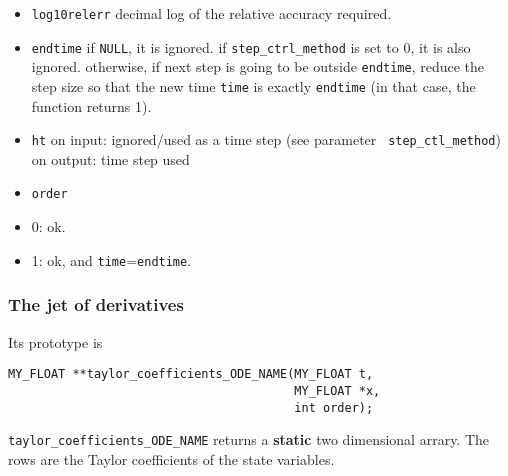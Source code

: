 \documentclass{article}
\begin{document}
{\begin{itemize}
  decimal log of the absolute accuracy required.
\item {\tt log10relerr}\newline
  decimal log of the relative accuracy required.
\item {\tt endtime}\newline
  if {\tt NULL}, it is ignored. if {\tt step\_ctrl\_method} is set to
  0, it is also ignored. otherwise, if next step is going to be
  outside {\tt endtime}, reduce the step size so that the new time
  {\tt time} is exactly {\tt endtime} (in that case, the function
  returns 1).
\item {\tt ht}\newline
  on input: ignored/used as a time step (see parameter {\tt
  step\_ctl\_method})\newline
  on output: time step used
\item {\tt order}

\end{itemize}

\begin{itemize}
\item 0: ok.
\item 1: ok, and {\tt time}={\tt endtime}.
\end{itemize}


\subsubsection{The jet of derivatives}
Its prototype is
\begin{verbatim}
MY_FLOAT **taylor_coefficients_ODE_NAME(MY_FLOAT t,
                                        MY_FLOAT *x,
                                        int order);
\end{verbatim}
\verb+taylor_coefficients_ODE_NAME+ returns a {\bf static} two 
dimensional arrary. The rows are the
Taylor coefficients of the state variables.

}
\end{document}
